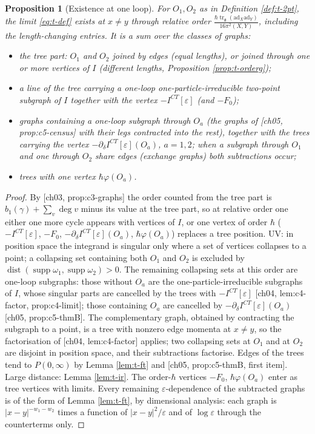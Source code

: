 \documentclass[11pt]{report}
\theoremstyle{plain}
\newtheorem{proposition}[theorem]{Proposition}
\theoremstyle{definition}
\numberwithin{equation}{chapter}
\newcommand{\unit}{\tfrac{\hbar\operatorname{tr}_{\mathfrak g}(\mathrm{ad}_X\mathrm{ad}_Y)}{16\pi^2(X,Y)}}
\begin{document}
\begin{proposition}[Existence at one loop]
\label{prop:t-exist}
For $O_1,O_2$ as in Definition \ref{def:t-2pt}, the limit \eqref{eq:t-def} exists at $x\neq y$ through relative order $\unit$, including the length-changing entries. It is a sum over the classes of graphs:
\begin{itemize}
\item[(T)] the tree part: $O_1$ and $O_2$ joined by edges (equal lengths), or joined through one or more vertices of $I$ (different lengths, Proposition \ref{prop:t-orderg});
\item[(SE)] a line of the tree carrying a one-loop one-particle-irreducible two-point subgraph of $I$ together with the vertex $-I^{CT}[\varepsilon]$ (and $-F_0$);
\item[(V)] graphs containing a one-loop subgraph through $O_a$ (the graphs of [ch05, prop:c5-census] with their legs contracted into the rest), together with the trees carrying the vertex $-\partial_\delta I^{CT}[\varepsilon](O_a)$, $a=1,2$; when a subgraph through $O_1$ and one through $O_2$ share edges (exchange graphs) both subtractions occur;
\item[(F)] trees with one vertex $\hbar\varphi(O_a)$.
\end{itemize}
\end{proposition}

\begin{proof}
By [ch03, prop:c3-graphs] the order counted from the tree part is $b_1(\gamma)+\sum_v\deg v$ minus its value at the tree part, so at relative order one either one more cycle appears with vertices of $I$, or one vertex of order $\hbar$ ($-I^{CT}[\varepsilon]$, $-F_0$, $-\partial_\delta I^{CT}[\varepsilon](O_a)$, $\hbar\varphi(O_a)$) replaces a tree position. UV: in position space the integrand is singular only where a set of vertices collapses to a point; a collapsing set containing both $O_1$ and $O_2$ is excluded by $\operatorname{dist}(\operatorname{supp}\omega_1,\operatorname{supp}\omega_2)>0$. The remaining collapsing sets at this order are one-loop subgraphs: those without $O_a$ are the one-particle-irreducible subgraphs of $I$, whose singular parts are cancelled by the trees with $-I^{CT}[\varepsilon]$ [ch04, lem:c4-factor, prop:c4-limit]; those containing $O_a$ are cancelled by $-\partial_\delta I^{CT}[\varepsilon](O_a)$ [ch05, prop:c5-thmB]. The complementary graph, obtained by contracting the subgraph to a point, is a tree with nonzero edge momenta at $x\neq y$, so the factorisation of [ch04, lem:c4-factor] applies; two collapsing sets at $O_1$ and at $O_2$ are disjoint in position space, and their subtractions factorise. Edges of the trees tend to $P(0,\infty)$ by Lemma \ref{lem:t-ft} and [ch05, prop:c5-thmB, first item]. Large distance: Lemma \ref{lem:t-ir}. The order-$\hbar$ vertices $-F_0$, $\hbar\varphi(O_a)$ enter as tree vertices with limits. Every remaining $\varepsilon$-dependence of the subtracted graphs is of the form of Lemma \ref{lem:t-ft}, by dimensional analysis: each graph is $|x-y|^{-w_1-w_2}$ times a function of $|x-y|^2/\varepsilon$ and of $\log\varepsilon$ through the counterterms only.
\end{proof}
\end{document}
